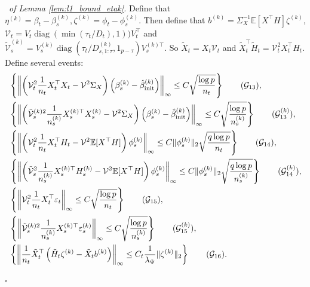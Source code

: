 \documentclass[12pt]{article}
\newenvironment{pf}{{\noindent \it Proof}\ }{\hfill $\square$\par}
\begin{document}
\begin{pf}{\it of Lemma \ref{lem:l1_bound_etak}. }
    Define that $\eta^{(k)} = \beta_t -\beta_s^{(k)},\zeta^{(k)} = \phi_t - \phi_s^{(k)}$. Then define that $b^{(k)} = \Sigma_X^{-1}\mathbb{E}[X^\top H]\zeta^{(k)}$, $\mathcal{V}_t = V_t\operatorname{diag}(\min(\tau_t/D_t),1))V_t^\top$ and $\tilde{\mathcal{V}}_s^{(k)} = V_s^{(k)}\operatorname{diag}(\tau_t/D_{s,1:\tau}^{(k)},1_{p-\tau})V_s^{(k)\top}$. So $\tilde{X}_t = X_t\mathcal{V}_t$ and $\tilde{X}_t^\top\tilde{H}_t =\mathcal{V}_t^2 X_t^\top H_t$. Define several events:
    \begin{align}
      &  \left\{\left\|\left(\mathcal{V}_t^2 \frac{1}{n_t}X_t^\top X_t - \mathcal{V}^2\Sigma_X \right)\left(\beta_s^{(k)}-\hat{\beta}_{\text{init}}^{(k)}\right)\right\|_{\infty} \le C\sqrt{\frac{\log p}{n_t}}\right\}\label{set:g_13}\tag{$\mathcal{G}_{13}$}, \\
     & \left\{\left\|\left(\tilde{\mathcal{V}}_s^{(k)2} \frac{1}{n_s^{(k)}}X_s^{(k)\top} X_s^{(k)} - \mathcal{V}^2\Sigma_X \right)\left(\beta_s^{(k)}-\hat{\beta}_{\text{init}}^{(k)}\right)\right\|_{\infty} \le C\sqrt{\frac{\log p}{n_s^{(k)}}}\right\}\label{set:g_13_k}\tag{$\mathcal{G}_{13}^{(k)}$}, \\
    & \left\{\left\|\left(\mathcal{V}_t^2 \frac{1}{n_t}X_t^\top H_t - \mathcal{V}^2\mathbb{E}[X^\top H] \right)\phi_s^{(k)}\right\|_{\infty} \le C\|\phi_s^{(k)}\|_2\sqrt{\frac{q\log p}{n_t}}\right\}\label{set:g_14}\tag{$\mathcal{G}_{14}$},\\
    & \left\{\left\|\left(\tilde{\mathcal{V}}_s^2 \frac{1}{n_s^{(k)}}X_s^{(k)\top} H_s^{(k)} - \mathcal{V}^2\mathbb{E}[X^\top H] \right)\phi_s^{(k)}\right\|_{\infty} \le C\|\phi_s^{(k)}\|_2\sqrt{\frac{q\log p}{n_s^{(k)}}}\right\}\label{set:g_14_k}\tag{$\mathcal{G}_{14}^{(k)}$},\\
        & \left\{\left\|\mathcal{V}_t^2 \frac{1}{n_t} X_t^\top\varepsilon_t\right\|_{\infty} \le C\sqrt{\frac{\log p}{n_t}}\right\}\label{set:g_15}\tag{$\mathcal{G}_{15}$},\\
    & \left\{\left\|\tilde{\mathcal{V}}_s^{(k)2} \frac{1}{n_s^{(k)}} X_s^{(k)\top}\varepsilon_s^{(k)}\right\|_{\infty} \le C\sqrt{\frac{\log p}{n_s^{(k)}}}\right\}\label{set:g_15_k}\tag{$\mathcal{G}_{15}^{(k)}$},\\
    & \left\{\left\|\frac{1}{n_t}\tilde{X}_t^\top \left(\tilde{H}_t\zeta^{(k)}-\tilde{X}_t b^{(k)}\right)\right\|_{\infty}\le C_t \frac{1}{\lambda_\Psi} \|\zeta^{(k)}\|_2\right\}\label{set:g_16}\tag{$\mathcal{G}_{16}$}. 
    \end{align}

\end{pf}
\end{document}
